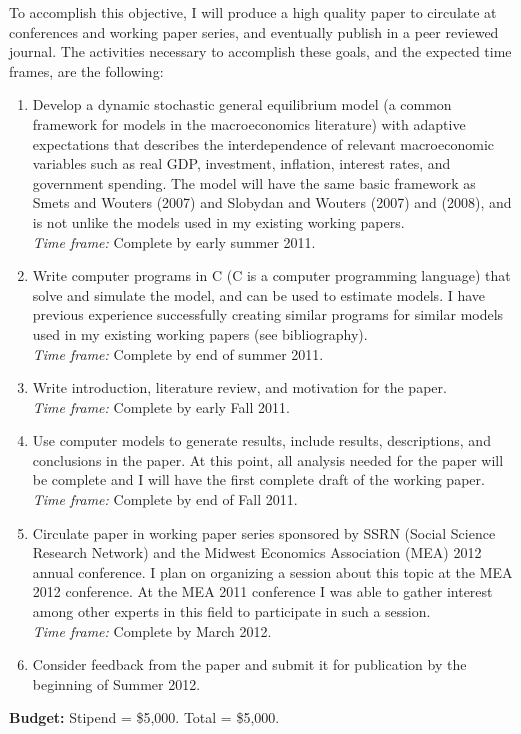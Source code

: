 \documentclass[12pt]{article}
\newcommand{\be}{\begin{enumerate}\setlength{\leftmargin}{0pt}}
\newcommand{\ee}{\end{enumerate}}
\begin{document}
To accomplish this objective, I will produce a high quality paper to circulate at conferences and working paper series, and eventually publish in a peer reviewed journal.  The activities necessary to accomplish these goals, and the expected time frames, are the following:
\be
\item Develop a dynamic stochastic general equilibrium model (a common framework for models in the macroeconomics literature) with adaptive expectations that describes the interdependence of relevant macroeconomic variables such as real GDP, investment, inflation, interest rates, and government spending.  The model will have the same basic framework as Smets and Wouters (2007) and Slobydan and Wouters (2007) and (2008), and is not unlike the models used in my existing working papers. \\
\textit{Time frame:} Complete by early summer 2011.
\item Write computer programs in C (C is a computer programming language) that solve and simulate the model, and can be used to estimate models.  I have previous experience successfully creating similar programs for similar models used in my existing working papers (see bibliography).\\
\textit{Time frame:} Complete by end of summer 2011.
\item Write introduction, literature review, and motivation for the paper.\\
\textit{Time frame:} Complete by early Fall 2011.
\item Use computer models to generate results, include results, descriptions, and conclusions in the paper.  At this point, all analysis needed for the paper will be complete and I will have the first complete draft of the working paper.\\
\textit{Time frame:} Complete by end of Fall 2011. 
\item Circulate paper in working paper series sponsored by SSRN (Social Science Research Network) and the Midwest Economics Association (MEA) 2012 annual conference.  I plan on organizing a session about this topic at the MEA 2012 conference.  At the MEA 2011 conference I was able to gather interest among other experts in this field to participate in such a session.\\
\textit{Time frame:} Complete by March 2012.
\item Consider feedback from the paper and submit it for publication by the beginning of Summer 2012.
\ee

\noindent \textbf{Budget:}  Stipend = \$5,000.  Total = \$5,000.

\vspace*{-0.4in}
\begin{singlespace}
\nocite{*}


\end{singlespace}
\end{document}
